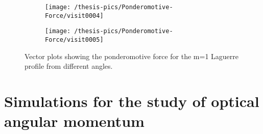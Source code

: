 \documentclass[12pt, class=report, crop=false]{standalone}
\begin{document}
\begin{figure}[!h]
  \centering
  \begin{subfigure}[t]{0.85\textwidth}
    \centering
    \texttt{[image: /thesis-pics/Ponderomotive-Force/visit0004]}
  \end{subfigure}
  \hfill
  \begin{subfigure}[t]{0.85\textwidth}
    \centering
    \texttt{[image: /thesis-pics/Ponderomotive-Force/visit0005]}
  \end{subfigure}
  \caption{Vector plots showing the ponderomotive force for the m=1 Laguerre profile from different angles.}
  \label{fig:ponderomotive-force-3}%
\end{figure}

\section{Simulations for the study of optical angular momentum}
\end{document}
